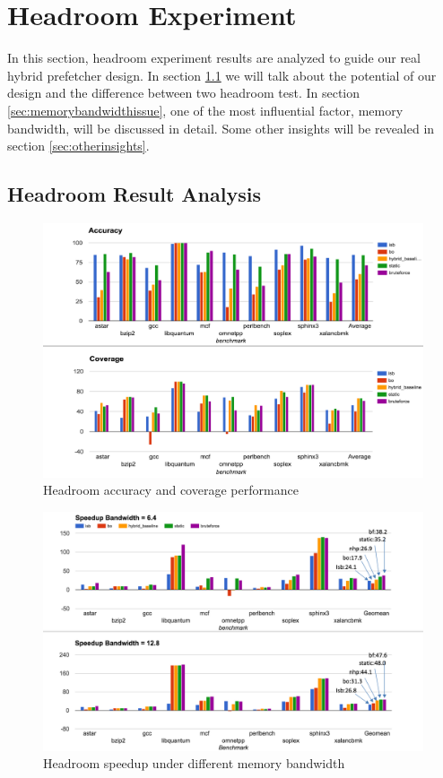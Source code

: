 \section{Headroom Experiment}
\label{sec:headroom}
In this section, headroom experiment results are analyzed to guide our real hybrid prefetcher design. In section \ref{sec:headroomanalysis} we will talk about the potential of our design and the difference between two headroom test. In section \ref{sec:memorybandwidthissue}, one of the most influential factor, memory bandwidth, will be discussed in detail. Some other insights will be revealed in section \ref{sec:otherinsights}.

  \subsection{Headroom Result Analysis}
  \label{sec:headroomanalysis}

  \begin{figure}[ht!]
	   \centering
	   \includegraphics[width=1.0\textwidth]{images/headroom_acc_cov.png}
	   \caption{Headroom accuracy and coverage performance}
	  \label{fig:headroom_acc_cov}
  \end{figure}

  \begin{figure}[ht!]
	   \centering
	   \includegraphics[width=1.0\textwidth]{images/headroom_speedup.png}
	   \caption{Headroom speedup under different memory bandwidth}
	  \label{fig:headroom_speedup}
  \end{figure}

